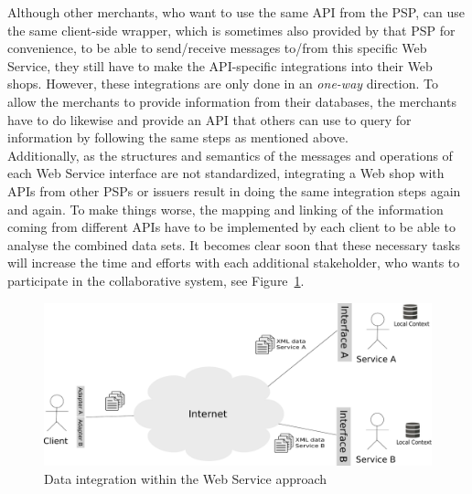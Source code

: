 Although other merchants, who want to use the same \gls{API} from the \gls{PSP}, can use the same client-side wrapper, which is sometimes also provided by that \gls{PSP} for convenience, to be able to send/receive messages to/from this specific Web Service, they still have to make the \gls{API}-specific integrations into their Web shops. However, these integrations are only done in an \emph{one-way} direction. To allow the merchants to provide information from their databases, the merchants have to do likewise and provide an \gls{API} that others can use to query for information by following the same steps as mentioned above. \\

Additionally, as the structures and semantics of the messages and operations of each Web Service interface are not standardized, integrating a Web shop with \gls{API}s from other \gls{PSP}s or issuers result in doing the same integration steps again and again. To make things worse, the mapping and linking of the information coming from different \gls{API}s have to be implemented by each client to be able to analyse the combined data sets. It becomes clear soon that these necessary tasks will increase the time and efforts with each additional stakeholder, who wants to participate in the collaborative system, see Figure~\ref{fig:web_services_scenario}. \\

\begin{figure}[!ht]
  \centering
  \includegraphics[width=0.9\columnwidth]{images/web-services-scenario.pdf}
  \caption{Data integration within the Web Service approach}
\label{fig:web_services_scenario}
\end{figure}


